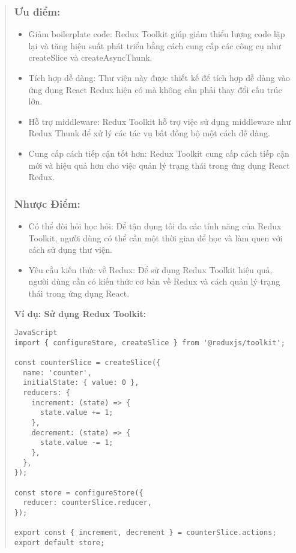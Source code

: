 \begin{quote}
\subsubsection{Ưu điểm:}
\begin{itemize}
  \item Giảm boilerplate code: Redux Toolkit giúp giảm thiểu lượng code lặp lại và tăng hiệu suất phát triển bằng cách cung cấp các công cụ như createSlice và createAsyncThunk.
  \item Tích hợp dễ dàng: Thư viện này được thiết kế để tích hợp dễ dàng vào ứng dụng React Redux hiện có mà không cần phải thay đổi cấu trúc lớn.
  \item Hỗ trợ middleware: Redux Toolkit hỗ trợ việc sử dụng middleware như Redux Thunk để xử lý các tác vụ bất đồng bộ một cách dễ dàng.
  \item Cung cấp cách tiếp cận tốt hơn: Redux Toolkit cung cấp cách tiếp cận mới và hiệu quả hơn cho việc quản lý trạng thái trong ứng dụng React Redux.
\end{itemize}

\subsubsection{Nhược Điểm:}
\begin{itemize}
  \item Có thể đòi hỏi học hỏi: Để tận dụng tối đa các tính năng của Redux Toolkit, người dùng có thể cần một thời gian để học và làm quen với cách sử dụng thư viện.
  \item Yêu cầu kiến thức về Redux: Để sử dụng Redux Toolkit hiệu quả, người dùng cần có kiến thức cơ bản về Redux và cách quản lý trạng thái trong ứng dụng React.
\end{itemize}

\textbf{Ví dụ: Sử dụng Redux Toolkit:}
\begin{lstlisting}
JavaScript
import { configureStore, createSlice } from '@reduxjs/toolkit';

const counterSlice = createSlice({
  name: 'counter',
  initialState: { value: 0 },
  reducers: {
    increment: (state) => {
      state.value += 1;
    },
    decrement: (state) => {
      state.value -= 1;
    },
  },
});

const store = configureStore({
  reducer: counterSlice.reducer,
});

export const { increment, decrement } = counterSlice.actions;
export default store;
\end{lstlisting}
\end{quote}

